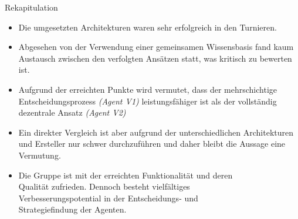 \documentclass[aspectratio=169]{beamer} %
\begin{document}
\begin{frame}{Rekapitulation}
\begin{itemize}
	\item Die umgesetzten Architekturen waren sehr erfolgreich in den Turnieren.
	\item Abgesehen von der Verwendung einer gemeinsamen Wissensbasis fand kaum Austausch zwischen den verfolgten Ansätzen statt, was kritisch zu bewerten ist.
	\item Aufgrund der erreichten Punkte wird vermutet, dass der mehrschichtige Entscheidungsprozess \textit{(Agent V1)} leistungsfähiger ist als der vollständig dezentrale Ansatz \textit{(Agent V2)}
	\item Ein direkter Vergleich ist aber aufgrund der unterschiedlichen Architekturen und Ersteller nur schwer durchzuführen und daher bleibt die Aussage eine Vermutung.
	\item Die Gruppe ist mit der erreichten Funktionalität und deren \\ Qualität zufrieden. Dennoch besteht vielfältiges \\ Verbesserungspotential in der Entscheidungs- und \\Strategiefindung der Agenten.
\end{itemize}
\end{frame}
\end{document}
